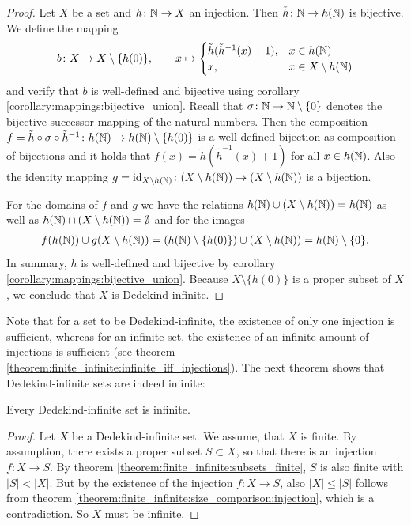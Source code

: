 \begin{proof}
    Let $X$ be a set and $h\colon \mathbb{N}\rightarrow X$ an injection. Then $\tilde h\colon\mathbb{N}\to h(\mathbb{N})$ is bijective. We define the mapping
    \begin{align}b\colon X\to X\setminus\{ h(0)\},\qquad x\mapsto\begin{cases} \tilde h(\tilde h^{-1}(x)+1), & x\in h(\mathbb{N})\\ x, & x\in X\setminus h(\mathbb{N})\end{cases}\end{align}
    and verify that $b$ is well-defined and bijective using corollary \ref{corollary:mappings:bijective_union}.
    Recall that $\sigma\colon \mathbb{N}\to\mathbb{N}\setminus\{0\}$ denotes the bijective successor mapping of the natural numbers. Then the composition $f=\tilde h\circ \sigma\circ\tilde h^{-1}\colon h(\mathbb{N})\to h(\mathbb{N})\setminus\{ h(0)\}$ is a well-defined bijection as composition of bijections and it holds that $f(x)=\tilde h(\tilde h^{-1}(x)+1)$ for all $x\in h(\mathbb{N})$. Also the identity mapping $g=\text{id}_ {X\setminus h(\mathbb{N})}\colon (X\setminus h(\mathbb{N}))\to (X\setminus h(\mathbb{N}))$ is a bijection.

    For the domains of $f$ and $g$ we have the relations $h(\mathbb{N})\cup(X\setminus h(\mathbb{N}))=h(\mathbb{N})$ as well as $h(\mathbb{N})\cap(X\setminus h(\mathbb{N}))=\emptyset$ and for the images \begin{align}f(h(\mathbb{N}))\cup g(X\setminus h(\mathbb{N}))=(h(\mathbb{N})\setminus\{h(0)\})\cup(X\setminus h(\mathbb{N}))=h(\mathbb{N})\setminus\{0\}.\end{align}
    In summary, $h$ is well-defined and bijective by corollary \ref{corollary:mappings:bijective_union}. Because $X\setminus\{h(0)\}$ is a proper subset of $X$, we conclude that $X$ is Dedekind-infinite.
\end{proof}

Note that for a set to be Dedekind-infinite, the existence of only one injection is sufficient, whereas for an infinite set, the existence of an infinite amount of injections is sufficient (see theorem \ref{theorem:finite_infinite:infinite_iff_injections}). The next theorem shows that Dedekind-infinite sets are indeed infinite:

\begin{theorem}\label{theorem:finite_infinite:dedekind_infinite_is_infinite}
    Every Dedekind-infinite set is infinite.
\end{theorem}
\begin{proof}
    Let $X$ be a Dedekind-infinite set. We assume, that $X$ is finite.
    By assumption, there exists a proper subset $S\subset X$, so that there is an injection $f\colon X\to S$. By theorem \ref{theorem:finite_infinite:subsets_finite}, $S$ is also finite with $|S|<|X|$. But by the existence of the injection $f\colon X\to S$, also $|X|\leq |S|$ follows from theorem \ref{theorem:finite_infinite:size_comparison:injection}, which is a contradiction. So $X$ must be infinite.
\end{proof}

